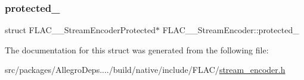 \mbox{\label{struct_f_l_a_c_____stream_encoder_a2820d2ad5c6395289b2abc7dc7399f76}} 
\subsubsection{\texorpdfstring{protected\+\_\+}{protected\_}}
{\footnotesize\ttfamily struct F\+L\+A\+C\+\_\+\+\_\+\+Stream\+Encoder\+Protected$\ast$ F\+L\+A\+C\+\_\+\+\_\+\+Stream\+Encoder\+::protected\+\_\+}



The documentation for this struct was generated from the following file\+:\begin{DoxyCompactItemize}
\item 
src/packages/\+Allegro\+Deps..../build/native/include/\+F\+L\+A\+C/\hyperlink{stream__encoder_8h}{stream\+\_\+encoder.\+h}\end{DoxyCompactItemize}
